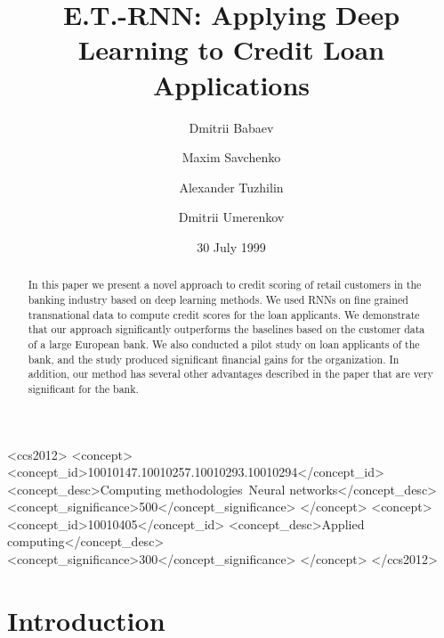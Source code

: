 \documentclass[sigconf]{acmart}
\begin{document}
\title{E.T.-RNN: Applying Deep Learning to Credit Loan Applications}


\author{Dmitrii Babaev}

\author{Maxim Savchenko}

\author{Alexander Tuzhilin}

\author{Dmitrii Umerenkov}

\date{30 July 1999}

\begin{abstract}
In this paper we present a novel approach to credit scoring of retail customers in the banking industry based on deep learning methods. We used RNNs on fine grained transnational data to compute credit scores for the loan applicants. We demonstrate that our approach significantly outperforms the baselines based on the customer data of a large European bank. We also conducted a pilot study on loan applicants of the bank, and the study produced significant financial gains for the organization.
In addition, our method has several other advantages described in the paper that are very significant for the bank.
\end{abstract}

\begin{CCSXML}
<ccs2012>
<concept>
<concept_id>10010147.10010257.10010293.10010294</concept_id>
<concept_desc>Computing methodologies~Neural networks</concept_desc>
<concept_significance>500</concept_significance>
</concept>
<concept>
<concept_id>10010405</concept_id>
<concept_desc>Applied computing</concept_desc>
<concept_significance>300</concept_significance>
</concept>
</ccs2012>
\end{CCSXML}



\maketitle

\section{Introduction}
\end{document}

